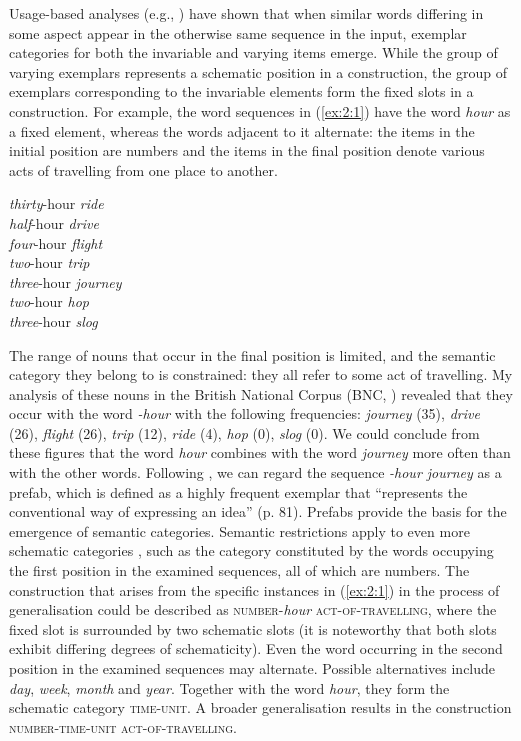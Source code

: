 Usage-based analyses (e.g., \citealt{boas-2003, lieven-etal-2003, goldberg-etal-2004, dabrowska-lieven-2005, bybee-eddington, boyd-goldberg-2011}) have shown that when similar words differing in some aspect appear in the otherwise same sequence in the input, exemplar categories for both the invariable and varying items emerge. While the group of varying exemplars represents a schematic position in a construction, the group of exemplars corresponding to the invariable elements form the fixed slots in a construction. For example, the word sequences in (\ref{ex:2:1}) have the word \textit{hour} as a fixed element, whereas the words adjacent to it alternate: the items in the initial position are numbers and the items in the final position denote various acts of travelling from one place to another.

\ea
	\label{ex:2:1}
	\textit{thirty}-hour \textit{ride}\\
	\textit{half}-hour \textit{drive}\\
	\textit{four}-hour \textit{flight}\\
	\textit{two}-hour \textit{trip}\\
	\textit{three}-hour \textit{journey}\\
	\textit{two}-hour \textit{hop}\\
	\textit{three}-hour \textit{slog}\hfill\hbox{\citep[data from][16--17]{hoey-lexical-2005}}
\z

\noindent The range of nouns that occur in the final position is limited, and the semantic category they belong to is constrained: they all refer to some act of travelling. My analysis of these nouns in the British National Corpus (BNC, \mbox{\citealt{bnc})} revealed that they occur with the word \textit{-hour} with the following frequencies: \textit{journey} (35), \textit{drive} (26), \textit{flight} (26), \textit{trip} (12), \textit{ride} (4), \textit{hop} (0), \textit{slog} (0). We could conclude from these figures that the word \textit{hour} combines with the word \textit{journey} more often than with the other words. Following \citet{bybee-book-2010}, we can regard the sequence \textit{-hour journey} as a prefab, which is defined as a highly frequent exemplar that ``represents the conventional way of expressing an idea'' (p. 81). Prefabs provide the basis for the emergence of semantic categories. Semantic restrictions apply to even more schematic categories \citep[cf.][81]{bybee-book-2010}, such as the category constituted by the words occupying the first position in the examined sequences, all of which are numbers. The construction that arises from the specific instances in (\ref{ex:2:1}) in the process of generalisation could be described as \textsc{number}-\textit{hour} \textsc{act-of-travelling}, where the fixed slot is surrounded by two schematic slots (it is noteworthy that both slots exhibit differing degrees of schematicity). Even the word occurring in the second position in the examined sequences may alternate. Possible alternatives include \textit{day}, \textit{week}, \textit{month} and \textit{year}. Together with the word \textit{hour}, they form the schematic category \textsc{time-unit}. A broader generalisation results in the construction \textsc{number-time-unit act-of-travelling}. 

